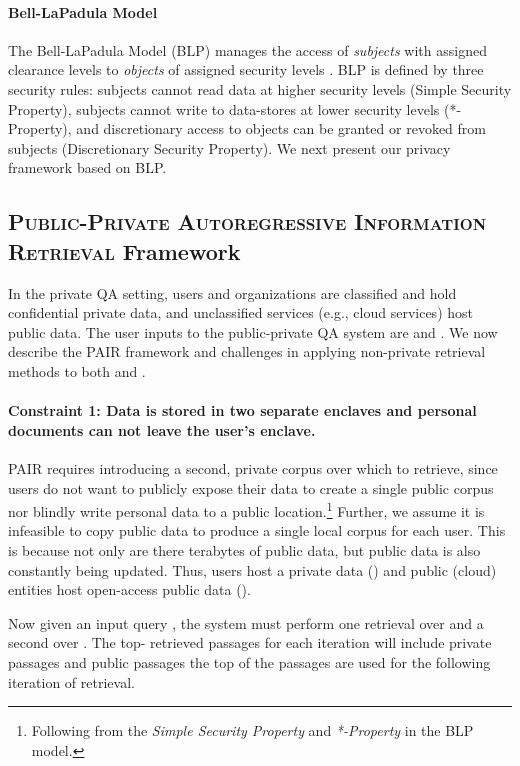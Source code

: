 \documentclass{article}
\renewcommand\cite{\citep}	\newcommand\shortcite{\citeyearpar}\newcommand\newcite{\citet}
\newcommand{\problemlongname}{\textsc{Public-Private Autoregressive Information Retrieval}\xspace}
\newcommand{\problemshortname}{\textsc{PAIR}\xspace}
\begin{document}
\paragraph{Bell-LaPadula Model} The Bell-LaPadula Model (BLP) manages the access of \textit{subjects} with assigned clearance levels to \textit{objects} of assigned security levels \cite{bell2976blm}. BLP is defined by three security rules: subjects cannot read data at higher security levels (Simple Security Property), subjects cannot write to data-stores at lower security levels (*-Property), and discretionary access to objects can be granted or revoked from subjects (Discretionary Security Property). We next present our privacy framework based on BLP.


\subsection{\problemlongname Framework} In the private QA setting, users and organizations are classified and hold confidential private data, and unclassified services (e.g., cloud services) host public data. The user inputs to the public-private QA system are  and . We now describe the \problemshortname framework and challenges in applying non-private retrieval methods to both  and .

\paragraph{Constraint 1: Data is stored in two separate enclaves and personal documents  can not leave the user's enclave.}  \problemshortname requires introducing a second, private corpus over which to retrieve, since users do not want to publicly expose their data to create a single public corpus nor blindly write personal data to a public location.\footnote{Following from the \textit{Simple Security Property} and \textit{*-Property} in the BLP model.} Further, we assume it is infeasible to copy public data to produce a single local corpus for each user. This is because not only are there terabytes of public data, but public data is also constantly being updated. Thus, users host a  private data () and public (cloud) entities host open-access public data ().

Now given an input query , the system must perform one retrieval over  and a second over . The top- retrieved passages for each iteration will include  private passages and  public passages the top  of the  passages are used for the following iteration of retrieval. 
\end{document}
